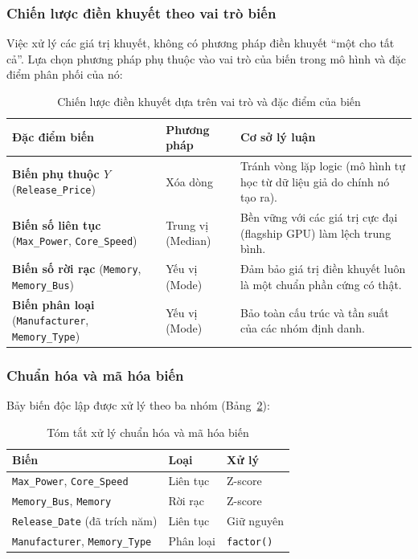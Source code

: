 \documentclass[a4paper]{article}
\begin{document}
\subsubsection{Chiến lược điền khuyết theo vai trò biến}

Việc xử lý các giá trị khuyết, không có phương pháp điền khuyết ``một cho tất cả''. Lựa chọn phương pháp phụ thuộc vào vai trò của biến trong mô hình và đặc điểm phân phối của nó:

\renewcommand{\arraystretch}{1.5}
\begin{table}[H]
\centering
\caption{Chiến lược điền khuyết dựa trên vai trò và đặc điểm của biến}
\label{tab:imputation_strategy}
\begin{tabular}{|p{4.5cm}|l|p{7.5cm}|}
\hline
\textbf{Đặc điểm biến} & \textbf{Phương pháp} & \textbf{Cơ sở lý luận} \\ \hline
\textbf{Biến phụ thuộc $Y$} \newline (\texttt{Release\_Price}) & Xóa dòng & Tránh vòng lặp logic (mô hình tự học từ dữ liệu giả do chính nó tạo ra). \\
\textbf{Biến số liên tục} \newline (\texttt{Max\_Power}, \texttt{Core\_Speed}) & Trung vị (Median) & Bền vững với các giá trị cực đại (flagship GPU) làm lệch trung bình. \\
\textbf{Biến số rời rạc} \newline (\texttt{Memory}, \texttt{Memory\_Bus}) & Yếu vị (Mode) & Đảm bảo giá trị điền khuyết luôn là một chuẩn phần cứng có thật. \\
\textbf{Biến phân loại} \newline (\texttt{Manufacturer}, \texttt{Memory\_Type}) & Yếu vị (Mode) & Bảo toàn cấu trúc và tần suất của các nhóm định danh. \\ \hline
\end{tabular}
\end{table}

\subsubsection{Chuẩn hóa và mã hóa biến}

Bảy biến độc lập được xử lý theo ba nhóm (Bảng~\ref{tab:var_encoding}):

\renewcommand{\arraystretch}{1.3}
\begin{table}[H]
\centering
\caption{Tóm tắt xử lý chuẩn hóa và mã hóa biến}
\label{tab:var_encoding}
\begin{tabular}{|l|l|l|}
\hline
\textbf{Biến} & \textbf{Loại} & \textbf{Xử lý} \\
\hline
\texttt{Max\_Power}, \texttt{Core\_Speed}     & Liên tục  & Z-score \\
\texttt{Memory\_Bus}, \texttt{Memory}         & Rời rạc   & Z-score \\
\texttt{Release\_Date} (đã trích năm)         & Liên tục  & Giữ nguyên \\
\texttt{Manufacturer}, \texttt{Memory\_Type}  & Phân loại & \texttt{factor()} \\
\hline
\end{tabular}
\end{table}
\end{document}
